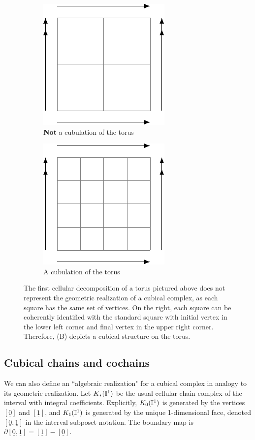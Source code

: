 \begin{figure}[h]
	\begin{subfigure}{.4\textwidth}
		\centering
		\includegraphics{figures/torus1.pdf}
		\caption{\textbf{Not} a cubulation of the torus}
	\end{subfigure}\qquad 
	\begin{subfigure}{.4\textwidth}
		\centering
		\includegraphics{figures/torus2.pdf}
		\caption{A cubulation of the torus}
	\end{subfigure}
	\caption{The first cellular decomposition of a torus pictured above does not represent the geometric realization of a cubical complex, as each square has the same set of vertices. On the right, each square can be coherently identified with the standard square with initial vertex in the lower left corner and final vertex in the upper right corner. Therefore, (B) depicts a cubical structure on the torus.}
	\label{F: cubical structure}
\end{figure}


\subsection{Cubical chains and cochains} \label{S: cubical cochains}

We can also define an ``algebraic realization" for a cubical complex in analogy to its geometric realization. 
Let $K_*(\mathbb{I}^1)$ be the usual cellular chain complex of the interval with integral coefficients.
Explicitly, $K_0(\mathbb{I}^1)$ is generated by the vertices $[\underline{0}]$ and $[\underline{1}]$, and $K_1(\mathbb{I}^1)$ is generated by the unique 1-dimensional face, denoted $[\underline{0},\underline{1}]$ in the interval subposet notation. The boundary map is $\partial [\underline{0},\underline{1}]=[\underline{1}]-[\underline{0}]$.


